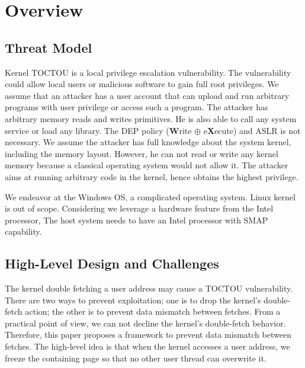 \section{Overview}
\label{sec:ktoctou-overview}




\subsection{Threat Model}
\label{sec:ktoctou-threatmodel}

Kernel TOCTOU is a local privilege escalation vulnerability. The vulnerability could allow local users or malicious software to gain full root privileges. We assume that an attacker has a user account that can upload and run arbitrary programs with user privilege or access such a program. The attacker has arbitrary memory reads and writes primitives. He is also able to call any system service or load any library. The DEP policy (\textbf{W}rite $\oplus$ e\textbf{X}ecute) and ASLR is not necessary. We assume the attacker has full knowledge about the system kernel, including the memory layout. However, he can not read or write any kernel memory because a classical operating system would not allow it. The attacker aims at running arbitrary code in the kernel, hence obtains the highest privilege.

We endeavor at the Windows OS, a complicated operating system. Linux kernel is out of scope. %
Considering we leverage a hardware feature from the Intel processor, The host system needs to have an Intel processor with SMAP capability.

\subsection{High-Level Design and Challenges}

The kernel double fetching a user address may cause a TOCTOU vulnerability. There are two ways to prevent exploitation; one is to drop the kernel's double-fetch action; the other is to prevent data mismatch between fetches. From a practical point of view, we can not decline the kernel's double-fetch behavior. Therefore, this paper proposes a framework to prevent data mismatch between fetches. The high-level idea is that when the kernel accesses a user address, we freeze the containing page so that no other user thread can overwrite it.


